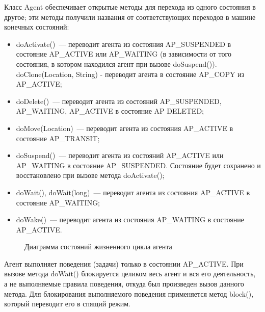 Класс Agent обеспечивает открытые методы для перехода из одного состояния в другое; эти методы получили названия от соответствующих переходов в машине конечных состояний:
\begin{itemize}
\item doActivate()~--- переводит агента из состояния AP\_SUSPENDED в состояние AP\_ACTIVE или AP\_WAITING (в зависимости от того состояния, в котором находился агент при вызове doSuspend()). doClone(Location, String) - переводит агента в состояние AP\_COPY из AP\_ACTIVE;
\item doDelete()~--- переводит агента из состояний AP\_SUSPENDED, AP\_WAITING, AP\_ACTIVE в состояние AP DELETED;
\item doMove(Location)~--- переводит агента из состояния AP\_ACTIVE в состояние AP\_TRANSIT;
\item doSuspend()~--- переводит агента из состояний AP\_ACTIVE или AP\_WAITING в состояние AP\_SUSPENDED. Состояние будет сохранено и восстановлено при вызове метода doActivate();
\item doWait(), doWait(long)~--- переводит агента из состояния AP\_ACTIVE в состояние AP\_WAITING;
\item doWake()~--- переводит агента из состояния AP\_WAITING в состояние AP\_ACTIVE.
\end{itemize}

\begin{figure}[h]
\caption{Диаграмма состояний жизненного цикла агента}
\label{2:life-cycle}
\end{figure}

Агент выполняет поведения (задачи) только в состоянии AP\_ACTIVE. При вызове метода doWait() блокируется целиком весь агент и вся его деятельность, а не выполняемые правила поведения, откуда был произведен вызов данного метода. Для блокирования выполняемого поведения применяется метод block(), который переводит его в спящий режим.

